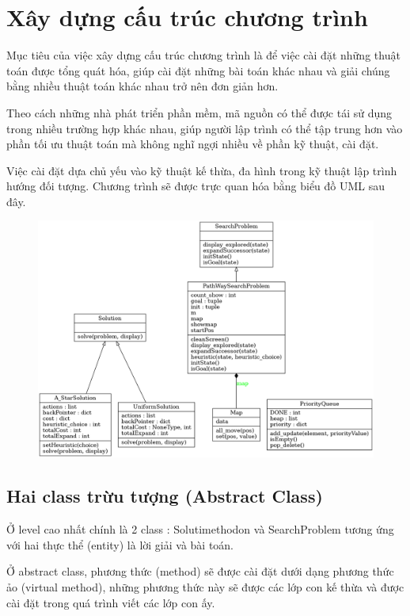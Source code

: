 \documentclass[11pt]{scrartcl} %
\begin{document}
\section{Xây dựng cấu trúc chương trình} \cite{standfordcs221}
Mục tiêu của việc xây dựng cấu trúc chương trình là để việc cài đặt những thuật toán được tổng quát hóa, giúp cài đặt những bài toán khác nhau và giải chúng bằng nhiều thuật toán khác nhau trở nên đơn giản hơn. 

Theo cách những nhà phát triển phần mềm, mã nguồn có thể được tái sử dụng trong nhiều trường hợp khác nhau, giúp người lập trình có thể tập trung hơn vào phần tối ưu thuật toán mà không nghĩ ngợi nhiều về phần kỹ thuật, cài đặt.

Việc cài đặt dựa chủ yếu vào kỹ thuật kế thừa, đa hình trong kỹ thuật lập trình hướng đối tượng. Chương trình sẽ được trực quan hóa bằng biểu đồ UML sau đây.

\newpage
\begin{figure}[h] %
	\centering
	\includegraphics[width=1.2\columnwidth]{classes_uml_diagram.png} %
\end{figure}

\subsection{Hai class trừu tượng (Abstract Class)}
Ở level cao nhất chính là 2 class : Solutimethodon và SearchProblem tương ứng với hai thực thể (entity) là lời giải và bài toán.

Ở abstract class, phương thức (method) sẽ được cài đặt dưới dạng phương thức ảo (virtual method), những phương thức này sẽ được các lớp con kế thừa và được cài đặt trong quá trình viết các lớp con ấy.
\end{document}
